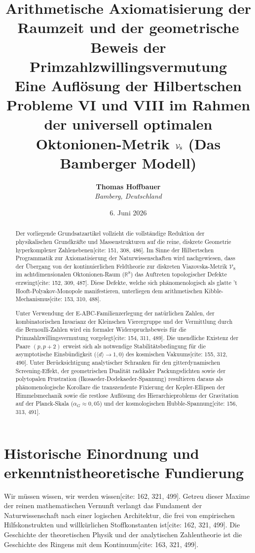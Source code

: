 \documentclass[11pt,a4paper]{article}
\title{\textbf{Arithmetische Axiomatisierung der Raumzeit und der geometrische Beweis der Primzahlzwillingsvermutung}\\
	\large Eine Auflösung der Hilbertschen Probleme VI und VIII im Rahmen der universell optimalen Oktonionen-Metrik $\Vmet$ (Das Bamberger Modell)}
\author{\textbf{Thomas Hoffbauer} \\
	\textit{Bamberg, Deutschland}}
\date{6. Juni 2026}
\newcommand{\R}{\mathbb{R}}
\newcommand{\Vmet}{\mathcal{V}_8}
\theoremstyle{definition}
\begin{document}
	
	\maketitle
	
	\begin{abstract}
		Der vorliegende Grundsatzartikel vollzieht die vollständige Reduktion der physikalischen Grundkräfte und Massenstrukturen auf die reine, diskrete Geometrie hyperkomplexer Zahlenebenen[cite: 151, 308, 486]. Im Sinne der Hilbertschen Programmatik zur Axiomatisierung der Naturwissenschaften wird nachgewiesen, dass der Übergang von der kontinuierlichen Feldtheorie zur diskreten Viazovska-Metrik $\Vmet$ im achtdimensionalen Oktonionen-Raum ($\R^8$) das Auftreten topologischer Defekte erzwingt[cite: 152, 309, 487]. Diese Defekte, welche sich phänomenologisch als glatte 't Hooft-Polyakov-Monopole manifestieren, unterliegen dem arithmetischen Kibble-Mechanismus[cite: 153, 310, 488]. 
		
		Unter Verwendung der E-ABC-Familienzerlegung der natürlichen Zahlen, der kombinatorischen Invarianz der Kleinschen Vierergruppe und der Vermittlung durch die Bernoulli-Zahlen wird ein formaler Widerspruchsbeweis für die Primzahlzwillingsvermutung vorgelegt[cite: 154, 311, 489]. Die unendliche Existenz der Paare $(p, p+2)$ erweist sich als notwendige Stabilitätsbedingung für die asymptotische Einsbündigkeit ($\langle d \rangle \rightarrow 1{,}0$) des kosmischen Vakuums[cite: 155, 312, 490]. Unter Berücksichtigung analytischer Schranken für den gitterdynamischen Screening-Effekt, der geometrischen Dualität radikaler Packungsdichten sowie der polytopalen Frustration (Ikosaeder-Dodekaeder-Spannung) resultieren daraus als phänomenologische Korollare die transzendente Fixierung der Kepler-Ellipsen der Himmelsmechanik sowie die restlose Auflösung des Hierarchieproblems der Gravitation auf der Planck-Skala ($\alpha_G \approx 0{,}05$) und der kosmologischen Hubble-Spannung[cite: 156, 313, 491].
	\end{abstract}
	
	\newpage
	\tableofcontents
	\newpage
	
	\section{Historische Einordnung und erkenntnistheoretische Fundierung}
	
	Wir müssen wissen, wir werden wissen[cite: 162, 321, 499]. Getreu dieser Maxime der reinen mathematischen Vernunft verlangt das Fundament der Naturwissenschaft nach einer logischen Architektur, die frei von empirischen Hilfskonstrukten und willkürlichen Stoffkonstanten ist[cite: 162, 321, 499]. Die Geschichte der theoretischen Physik und der analytischen Zahlentheorie ist die Geschichte des Ringens mit dem Kontinuum[cite: 163, 321, 499].
	
\end{document}
